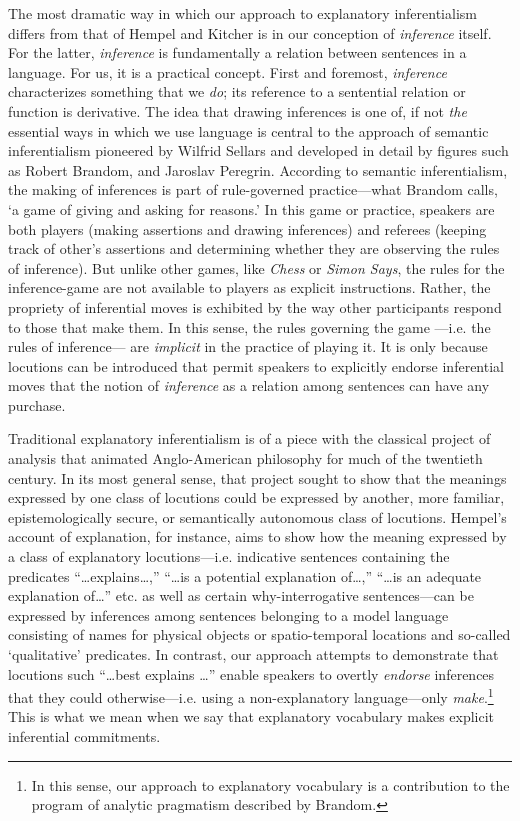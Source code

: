 \documentclass{svjour3}                     %
\begin{document}
The most dramatic way in which our approach to explanatory inferentialism differs from that of Hempel and Kitcher is in our conception of \textit{inference} itself. For the latter, \textit{inference} is fundamentally a relation between sentences in a language. For us, it is a  practical concept. First and foremost, \textit{inference} characterizes something that we \textit{do}; its reference to a sentential relation or function is derivative. The idea that drawing inferences is one of, if not \textit{the} essential ways in which we use language is central to the approach of semantic inferentialism pioneered by Wilfrid Sellars and developed in detail by figures such as Robert Brandom, and Jaroslav Peregrin. According to semantic inferentialism, the making of inferences is part of rule-governed practice---what Brandom calls, `a game of giving and asking for reasons.' In this game or practice, speakers are both players (making assertions and drawing inferences) and referees (keeping track of other's assertions and determining whether they are observing the rules of inference). But unlike other games, like \textit{Chess} or \textit{Simon Says}, the rules for the inference-game are not available to players as explicit instructions. Rather, the propriety of inferential moves is exhibited by the way other participants respond to those that make them. In this sense, the rules governing the game ---i.e. the rules of inference--- are \textit{implicit} in the practice of playing it. It is only because locutions can be introduced that permit speakers to explicitly endorse inferential moves that the notion of \textit{inference} as a relation among sentences can have any purchase.

Traditional explanatory inferentialism is of a piece with the classical project of analysis that animated Anglo-American philosophy for much of the twentieth century. In its most general sense, that project sought to show that the meanings expressed by one class of locutions could be expressed by another, more familiar, epistemologically secure, or semantically autonomous class of locutions. Hempel's account of explanation, for instance, aims to show how the meaning expressed by a class of explanatory locutions---i.e. indicative sentences containing the predicates ``\ldots explains\ldots,'' ``\ldots is a potential explanation of\ldots,'' ``\ldots is an adequate explanation of\ldots'' etc. as well as certain why-interrogative sentences---can be expressed by inferences among sentences belonging to a model language consisting of names for physical objects or spatio-temporal locations and so-called `qualitative' predicates. In contrast, our approach attempts to demonstrate that locutions such ``\ldots best explains \ldots'' enable speakers to overtly \textit{endorse} inferences that they could otherwise---i.e. using a non-explanatory language---only \textit{make}.\footnote{In this sense, our approach to explanatory vocabulary is a contribution to the program of analytic pragmatism described by Brandom. } This is what we mean when we say that explanatory vocabulary makes explicit inferential commitments.
\end{document}
